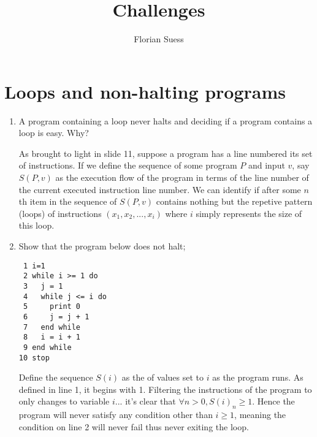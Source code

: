 \documentclass{article}
\title {Challenges}
\author {Florian Suess}
\newenvironment{answered}{\par\normalfont}{}
\begin{document}
\maketitle
\section{Loops and non-halting programs}

\begin{enumerate}
	\item A program containing a loop never halts and deciding if a program contains a loop is easy. Why?
	\begin{answered}
		As brought to light in slide 11, suppose a program has a line numbered its set of instructions. If we define the sequence of some program $P$ and input $v$, say $S(P, v)$ as the execution flow of the program in terms of the line number of the current executed instruction line number. We can identify if after some $n$th item in the sequence of $S(P,v)$ contains nothing but the repetive pattern (loops) of instructions $(x_1, x_2, ..., x_i)$ where $i$ simply represents the size of this loop.
	\end{answered}
\item Show that the program below does not halt;
\begin{verbatim}
 1 i=1
 2 while i >= 1 do 
 3   j = 1
 4   while j <= i do
 5     print 0
 6     j = j + 1
 7   end while	
 8   i = i + 1
 9 end while
10 stop
\end{verbatim}
 \begin{answered}
	 Define the sequence $S(i)$ as the of values set to $i$ as the program runs. As defined in line 1, it begins with 1. Filtering the instructions of the program to only changes to variable $i$... it's clear that $\forall n > 0, S(i)_n \geq 1$. Hence the program will never satisfy any condition other than $i \geq 1$, meaning the condition on line 2 will never fail thus never exiting the loop.
 \end{answered}
\end{enumerate}
\end{document}
